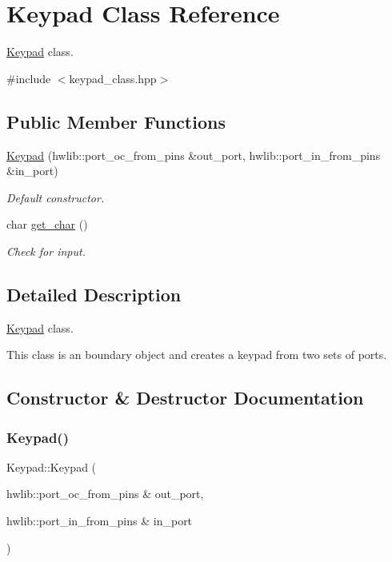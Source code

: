\hypertarget{class_keypad}{}\section{Keypad Class Reference}
\label{class_keypad}


\hyperlink{class_keypad}{Keypad} class.  




{\ttfamily \#include $<$keypad\+\_\+class.\+hpp$>$}

\subsection*{Public Member Functions}
\begin{DoxyCompactItemize}
\item 
\hyperlink{class_keypad_a5d8b8cf0e33463dabefd8b30ec4c43e8}{Keypad} (hwlib\+::port\+\_\+oc\+\_\+from\+\_\+pins \&out\+\_\+port, hwlib\+::port\+\_\+in\+\_\+from\+\_\+pins \&in\+\_\+port)
\begin{DoxyCompactList}\small\item\em Default constructor. \end{DoxyCompactList}\item 
char \hyperlink{class_keypad_aef896a8cccb21f0b49579ed6d3c7e026}{get\+\_\+char} ()
\begin{DoxyCompactList}\small\item\em Check for input. \end{DoxyCompactList}\end{DoxyCompactItemize}


\subsection{Detailed Description}
\hyperlink{class_keypad}{Keypad} class. 

This class is an boundary object and creates a keypad from two sets of ports. 

\subsection{Constructor \& Destructor Documentation}
\hypertarget{class_keypad_a5d8b8cf0e33463dabefd8b30ec4c43e8}{}\label{class_keypad_a5d8b8cf0e33463dabefd8b30ec4c43e8} 
\subsubsection{\texorpdfstring{Keypad()}{Keypad()}}
{\footnotesize\ttfamily Keypad\+::\+Keypad (\begin{DoxyParamCaption}\item[{hwlib\+::port\+\_\+oc\+\_\+from\+\_\+pins \&}]{out\+\_\+port,  }\item[{hwlib\+::port\+\_\+in\+\_\+from\+\_\+pins \&}]{in\+\_\+port }\end{DoxyParamCaption})\hspace{0.3cm}{\ttfamily [inline]}}



